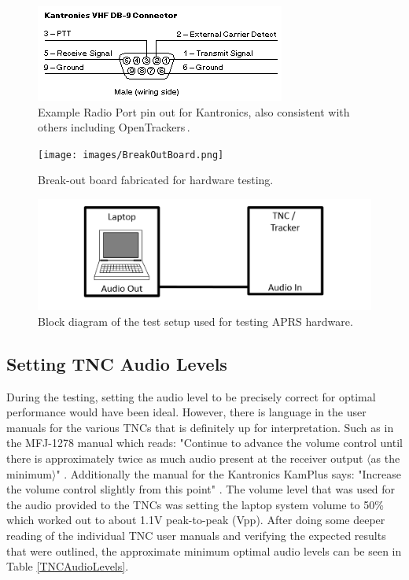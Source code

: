 \begin{figure}
  \centering
	\includegraphics[width=0.75\linewidth]{images/RadioPortPinout.png} 
	\caption{Example Radio Port pin out for Kantronics, also consistent with others including OpenTrackers\,\cite{Martin2014}.}
   \label{RadioPortPinout}
\end{figure}
\begin{figure}
  \centering
	\texttt{[image: images/BreakOutBoard.png]} 
	\caption{Break-out board fabricated for hardware testing.}
   \label{BreakOutBoard}
\end{figure}
\begin{figure}
  \centering
	\includegraphics[width=0.75\linewidth]{images/TNCLaptopTestSetup.PNG} 
	\caption{Block diagram of the test setup used for testing APRS hardware.}
   \label{TNCLaptopTestSetup}
\end{figure}

\subsection{Setting TNC Audio Levels}
During the testing, setting the audio level to be precisely correct for optimal performance would have been ideal. However, there is language in the user manuals for the various TNCs that is definitely up for interpretation. Such as in the MFJ-1278 manual which reads: "Continue to advance the volume control until there is approximately twice as much audio present at the receiver output $\langle$as the minimum$\rangle$" \cite{MFJ1278Man}. Additionally the manual for the Kantronics KamPlus says: "Increase the volume control slightly from this point" \cite{KamPlusGettingStarted}. The volume level that was used for the audio provided to the TNCs was setting the laptop system volume to 50\% which worked out to about 1.1V peak-to-peak (Vpp). After doing some deeper reading of the individual TNC user manuals and verifying the expected results that were outlined, the approximate minimum optimal audio levels can be seen in Table \ref{TNCAudioLevels}.

